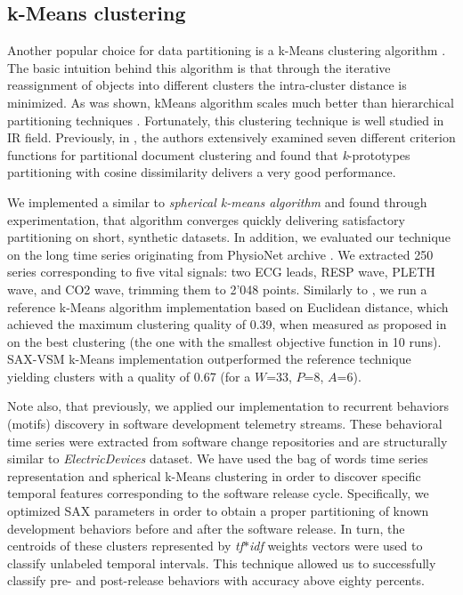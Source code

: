 \documentclass{llncs}
\begin{document}
\subsection{k-Means clustering} \label{trajectory}
Another popular choice for data partitioning is a k-Means clustering algorithm \cite{kmeans}.
The basic intuition behind this algorithm is that through the iterative reassignment of objects 
into different clusters the intra-cluster distance is minimized. As was shown, kMeans 
algorithm scales much better than hierarchical partitioning techniques \cite{kscale}.
Fortunately, this clustering technique is well studied in IR field. Previously, in \cite{zhao}, the
authors extensively examined seven different criterion functions for partitional document
clustering and found that \textit{k}-prototypes partitioning with cosine dissimilarity delivers a
very good performance. 

We implemented a similar to \cite{modha} \textit{spherical k-means algorithm} and found through
experimentation, that algorithm converges quickly delivering satisfactory partitioning on
short, synthetic datasets. In addition, we evaluated our technique on the long time series 
originating from PhysioNet archive \cite{physionet}. We extracted 250 series corresponding
to five vital signals: two ECG leads, RESP wave, PLETH wave, and  CO2 wave,
trimming them to 2'048 points. Similarly to \cite{bag_patterns}, we run a reference k-Means 
algorithm implementation based on Euclidean distance, which achieved the maximum 
clustering quality of 0.39, when measured as proposed in \cite{kmetrics} on the best 
clustering (the one with the smallest objective function in 10 runs). 
SAX-VSM k-Means implementation outperformed the reference technique yielding clusters 
with a quality of 0.67 (for a $W$=33, $P$=8, $A$=6).

Note also, that previously, we applied our implementation to recurrent behaviors (motifs) 
discovery in software development telemetry streams\cite{android}. 
These behavioral time series were extracted from software change repositories and are 
structurally similar to \textit{ElectricDevices} dataset. 
We have used the bag of words time series representation and spherical k-Means clustering 
in order to discover specific temporal features corresponding to the software release cycle. 
Specifically, we optimized SAX parameters in order to obtain a proper partitioning of known 
development behaviors before and after the software release. In turn, the centroids of these 
clusters represented by \textit{tf$\ast$idf} weights vectors were used to classify unlabeled  
temporal intervals. This technique allowed us to successfully classify pre- and post-release
behaviors with accuracy above eighty percents.
\end{document}
